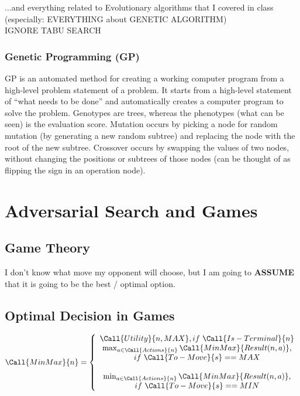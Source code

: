 \documentclass[exam={Midterm},color=true]{cs581exam}
\renewcommand{\emph}[1]{\textbf{#1}}
\begin{document}
$\dots$and everything related to Evolutionary algorithms that I covered in class (especially: EVERYTHING about GENETIC ALGORITHM)\\
IGNORE TABU SEARCH

\subsubsection{Genetic Programming (GP)}\label{subsubsec:genetic-programming}
GP is an automated method for creating a working computer program from a high-level problem statement of a problem.
It starts from a high-level statement of ``what needs to be done'' and automatically creates a computer program to solve the problem.
Genotypes are trees, whereas the phenotypes (what can be seen) is the evaluation score.
Mutation occurs by picking a node for random mutation (by generating a new random subtree) and replacing the node with the root of the new subtree.
Crossover occurs by swapping the values of two nodes, without changing the positions or subtrees of those nodes (can be thought of as flipping the sign in an operation node).

\section{Adversarial Search and Games}\label{sec:adversarial-search-and-games}
\subsection{Game Theory}\label{subsec:5.1}
I don't know what move my opponent will choose, but I am going to \emph{ASSUME} that it is going to be the best / optimal option.

\subsection{Optimal Decision in Games}\label{subsec:5.2}
\[ \Call{MinMax}{n} = \left\{ \begin{array}{c}
	\Call{Utility}{n, MAX},if\ \Call{Is-Terminal}{n}\\
	\max_{a\in\Call{Actions}{n}}\Call{MinMax}{Result(n,a)},\\if\ \Call{To-Move}{s} == MAX\\\\
	\min_{a\in\Call{Actions}{n}}\Call{MinMax}{Result(n,a)},\\if\ \Call{To-Move}{s} == MIN\\
\end{array} \right. \]
\end{document}
